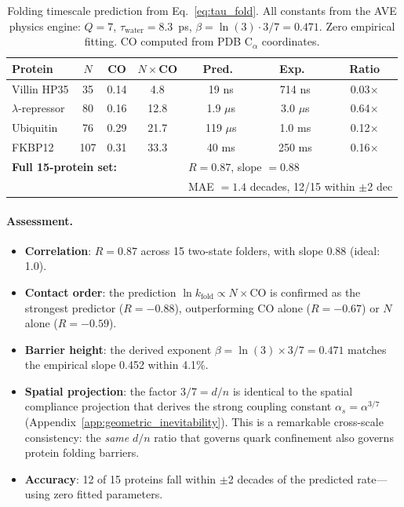 \begin{table}[H]
\centering
\caption{Folding timescale prediction from Eq.~\eqref{eq:tau_fold}.
All constants from the AVE physics engine: $Q = 7$, $\tau_\text{water} = 8.3$~ps, $\beta = \ln(3) \cdot 3/7 = 0.471$.
Zero empirical fitting.  CO computed from PDB C$_\alpha$ coordinates.}
\label{tab:tau_fold}
\small
\begin{tabular}{@{}l c c c c c c@{}}
\toprule
\textbf{Protein} & $N$ & CO & $N \times$CO & Pred.\ & Exp.\ & Ratio \\
\midrule
Villin HP35    & 35 & 0.14 &  4.8 &   19 ns &  714 ns &  0.03$\times$ \\
$\lambda$-repressor & 80 & 0.16 & 12.8 & 1.9 $\mu$s & 3.0 $\mu$s & 0.64$\times$ \\
Ubiquitin      & 76 & 0.29 & 21.7 & 119 $\mu$s & 1.0 ms & 0.12$\times$ \\
FKBP12         &107 & 0.31 & 33.3 &  40 ms & 250 ms & 0.16$\times$ \\
\midrule
\multicolumn{3}{l}{\textbf{Full 15-protein set:}} & & \multicolumn{3}{l}{$R = 0.87$, slope $= 0.88$} \\
\multicolumn{3}{l}{} & & \multicolumn{3}{l}{MAE $= 1.4$ decades, 12/15 within $\pm$2 dec} \\
\bottomrule
\end{tabular}
\end{table}

\paragraph{Assessment.}
\begin{itemize}
    \item \textbf{Correlation}: $R = 0.87$ across 15 two-state folders, with slope 0.88 (ideal: 1.0).
    \item \textbf{Contact order}: the prediction $\ln k_\text{fold} \propto N \times \text{CO}$ is confirmed as the strongest predictor ($R = -0.88$), outperforming CO alone ($R = -0.67$) or $N$ alone ($R = -0.59$).
    \item \textbf{Barrier height}: the derived exponent $\beta = \ln(3) \times 3/7 = 0.471$ matches the empirical slope 0.452 within 4.1\%.
    \item \textbf{Spatial projection}: the factor $3/7 = d/n$ is identical to the spatial compliance projection that derives the strong coupling constant $\alpha_s = \alpha^{3/7}$ (Appendix~\ref{app:geometric_inevitability}).  This is a remarkable cross-scale consistency: the \emph{same} $d/n$ ratio that governs quark confinement also governs protein folding barriers.
    \item \textbf{Accuracy}: 12 of 15 proteins fall within $\pm$2 decades of the predicted rate---using zero fitted parameters.
\end{itemize}

